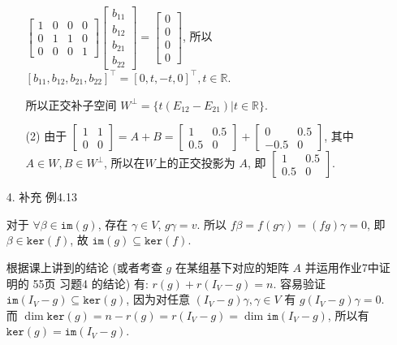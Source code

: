 \documentclass{article}
\begin{document}
\begin{spacing}{1.5}
\begin{enumerate}
\begin{itemize}
        $\left[\begin{array}{cccc}1&0&0&0\\0&1&1&0\\0&0&0&1\end{array}\right]\left[\begin{array}{c}b_{11}\\b_{12}\\b_{21}\\b_{22}\end{array}\right] = \left[\begin{array}{c}0\\0\\0\\0\end{array}\right]$, 所以 $[b_{11}, b_{12}, b_{21}, b_{22}]^\top = [0, t, -t, 0]^\top, t\in\mathbb{R}$.

        所以正交补子空间 $W^\perp = \{t(E_{12} - E_{21}) | t\in\mathbb{R}\}$.

        \item [(2)] 由于 $\left[\begin{array}{cc}1&1\\0&0\end{array}\right] = A + B = \left[\begin{array}{cc}1&0.5\\0.5&0\end{array}\right] + \left[\begin{array}{cc}0&0.5\\-0.5&0\end{array}\right]$, 其中 $A\in W, B\in W^\perp$, 所以在$W$上的正交投影为 $A$, 即 $\left[\begin{array}{cc}1&0.5\\0.5&0\end{array}\right]$.
        
    \end{itemize}

    \item [4.] 补充 例4.13
    
    对于 $\forall \beta\in \mathtt{im}(g)$, 存在 $\gamma\in V$, $g\gamma = v$. 所以 $f\beta = f(g\gamma) = (fg) \gamma = 0$, 即 $\beta \in \mathtt{ker}(f)$,
    故 $\mathtt{im}(g)\subseteq \mathtt{ker}(f)$.

    根据课上讲到的结论 (或者考查 $g$ 在某组基下对应的矩阵 $A$ 并运用作业7中证明的 55页 习题4 的结论) 有:
    $r(g) + r(I_V - g) = n$. 容易验证 $\mathtt{im}(I_V - g) \subseteq \mathtt{ker}(g)$, 因为对任意 $(I_V - g)\gamma, \gamma\in V$ 有 $g(I_V-g)\gamma = 0$. 而 $\dim\mathtt{ker}(g) = n-r(g) = r(I_V-g)=\dim\mathtt{im}(I_V-g)$, 所以有 $\mathtt{ker}(g) = \mathtt{im}(I_V - g)$. 
    

\end{enumerate}
\end{spacing}
\end{document}
